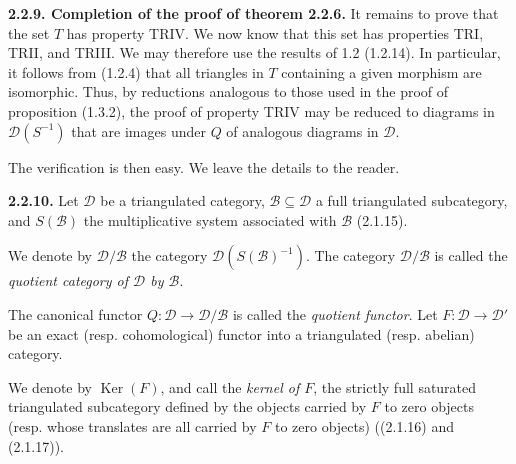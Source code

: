 \smallskip
\noindent\textbf{2.2.9. Completion of the proof of theorem 2.2.6.}
%
It remains to prove that the set $T$ has property TRIV. We now know that
this set has properties TRI, TRII, and TRIII. We may therefore use the
results of 1.2 (1.2.14). In particular, it follows from (1.2.4) that all
triangles in $T$ containing a given morphism are isomorphic. Thus, by
reductions analogous to those used in the proof of proposition (1.3.2),
the proof of property TRIV may be reduced to diagrams in
$\mathcal D(S^{-1})$ that are images under $Q$ of analogous diagrams in
$\mathcal D$.

The verification is then easy. We leave the details to the reader.

\smallskip
\noindent\textbf{2.2.10.}\quad
Let $\mathcal D$ be a triangulated category,
$\mathcal B\subseteq\mathcal D$ a full triangulated subcategory, and
$S(\mathcal B)$ the multiplicative system associated with $\mathcal B$
(2.1.15).

We denote by $\mathcal D/\mathcal B$ the category
$\mathcal D(S(\mathcal B)^{-1})$. The category $\mathcal D/\mathcal B$
is called the \emph{quotient category of $\mathcal D$ by $\mathcal B$}.

The canonical functor
$Q\colon\mathcal D\longrightarrow\mathcal D/\mathcal B$ is called the
\emph{quotient functor}. Let
$F\colon\mathcal D\longrightarrow\mathcal D'$ be an exact
(resp. cohomological) functor into a triangulated (resp. abelian) category.

We denote by $\operatorname{Ker}(F)$, and call the \emph{kernel of $F$},
the strictly full saturated triangulated subcategory defined by the
objects carried by $F$ to zero objects (resp. whose translates are all
carried by $F$ to zero objects) ((2.1.16) and (2.1.17)).

\endgroup


